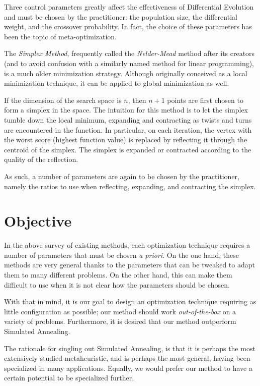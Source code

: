 \documentclass[12pt]{article}
\begin{document}
    Three control parameters greatly affect the effectiveness of Differential
    Evolution and must be chosen by the practitioner\cite{storn1997}: the
    population size, the differential weight, and the crossover probability.
    In fact, the choice of these parameters has been the topic of
    meta-optimization\cite{pedersen2010}.

    The \emph{Simplex Method}\cite{nelder1965}, frequently called the
    \emph{Nelder-Mead} method after its creators (and to avoid confusion with a
    similarly named method for linear programming), is a much older
    minimization strategy. Although originally conceived as a local
    minimization technique, it can be applied to global minimization as well.

    If the dimension of the search space is $n$, then $n+1$ points are first
    chosen to form a simplex in the space. The intuition for this method is to
    let the simplex tumble down the local minimum, expanding and contracting as
    twists and turns are encountered in the function. In particular, on each
    iteration, the vertex with the worst score (highest function value) is
    replaced by reflecting it through the centroid of the simplex. The simplex
    is expanded or contracted according to the quality of the reflection.

    As such, a number of parameters are again to be chosen by the practitioner,
    namely the ratios to use when reflecting, expanding, and contracting the
    simplex.

\section{Objective}
    In the above survey of existing methods, each optimization technique
    requires a number of parameters that must be chosen \emph{a priori}. On the
    one hand, these methods are very general thanks to the parameters that can
    be tweaked to adapt them to many different problems. On the other hand,
    this can make them difficult to use when it is not clear how the parameters
    should be chosen.

    With that in mind, it is our goal to design an optimization technique
    requiring as little configuration as possible; our method should work
    \emph{out-of-the-box} on a variety of problems. Furthermore, it is desired
    that our method outperform Simulated Annealing.

    The rationale for singling out Simulated Annealing, is that it is perhaps
    the most extensively studied metaheuristic, and is perhaps the most
    general, having been specialized in many applications. Equally, we would
    prefer our method to have a certain potential to be specialized further.
\end{document}
